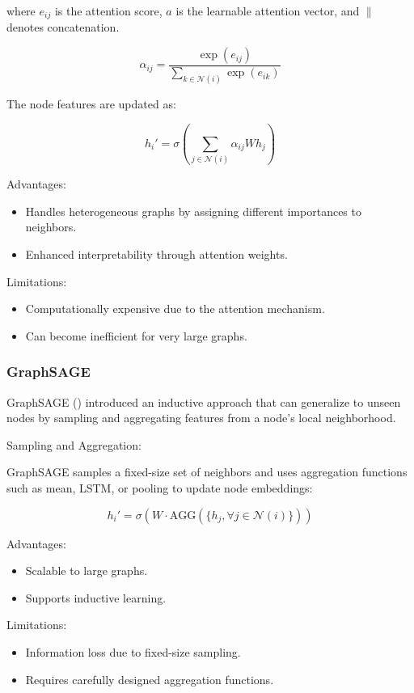 where \( e_{ij} \) is the attention score, \( a \) is the learnable attention vector, and \( \| \) denotes concatenation.

\[ \alpha_{ij} = \frac{\exp(e_{ij})}{\sum_{k \in \mathcal{N}(i)} \exp(e_{ik})} \]

The node features are updated as:

\[ h_i' = \sigma\left(\sum_{j \in \mathcal{N}(i)} \alpha_{ij} W h_j\right) \]

Advantages:
\begin{itemize}
    \item Handles heterogeneous graphs by assigning different importances to neighbors.
    \item Enhanced interpretability through attention weights.
\end{itemize}


Limitations:
\begin{itemize}
    \item Computationally expensive due to the attention mechanism.
    \item Can become inefficient for very large graphs.
\end{itemize}

\subsubsection*{GraphSAGE}

GraphSAGE (\cite{Hamilton2017}) introduced an inductive approach that can generalize to unseen nodes by sampling and aggregating features from a node's local neighborhood.

Sampling and Aggregation:

GraphSAGE samples a fixed-size set of neighbors and uses aggregation functions such as mean, LSTM, or pooling to update node embeddings:

\[ h_i' = \sigma\left(W \cdot \text{AGG}\left(\{h_j, \forall j \in \mathcal{N}(i)\}\right)\right) \]

Advantages:
\begin{itemize}
    \item Scalable to large graphs.
    \item Supports inductive learning.
\end{itemize}


Limitations:
\begin{itemize}
    \item Information loss due to fixed-size sampling.
    \item Requires carefully designed aggregation functions.
\end{itemize}


